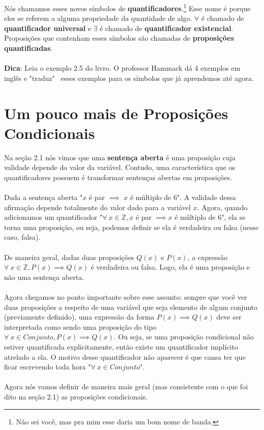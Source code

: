 \documentclass[a4paper,11pt]{book}
\theoremstyle{definition}
\theoremstyle{break}
\begin{document}
Nós chamamos esses novos símbolos de \textbf{quantificadores}.\footnote{Não sei você, mas pra mim esse daria um bom nome de banda.} Esse nome é porque eles se referem a alguma propriedade da quantidade de algo. $\forall$ é chamado de \textbf{quantificador universal} e $\exists$ é chamado de \textbf{quantificador existencial}. Proposições que contenham esses símbolos são chamadas de \textbf{proposições quantificadas}.
\\
\\
\textbf{Dica}: Leia o exemplo 2.5 do livro. O professor Hammack dá 4 exemplos em inglês e "traduz" \ esses exemplos para os símbolos que já aprendemos até agora.

\section{Um pouco mais de Proposições Condicionais}

Na seção 2.1 nós vimos que uma \textbf{sentença aberta} é uma proposição cuja validade depende do valor da variável. Contudo, uma característica que os quantificadores possuem é transformar sentenças abertas em proposições.
\\
\\
Dada a sentença aberta "$x$ é par $\implies$ $x$ é múltiplo de 6". A validade dessa afirmação depende totalmente do valor dado para a variável $x$. Agora, quando adicionamos um quantificador "$\forall \ x \in \mathbb{Z}, x$ é par $\implies x$ é múltiplo de 6", ela se torna uma proposição, ou seja, podemos definir se ela é verdadeira ou falsa (nesse caso, falsa).
\\
\\
De maneira geral, dadas duas proposições $Q(x)$ e $P(x)$, a expressão $\forall \ x \in \mathbb{Z}, P(x) \implies Q(x)$ é verdadeira ou falsa. Logo, ela é uma proposição e não uma sentença aberta.
\\
\\
Agora chegamos no ponto importante sobre esse assunto: sempre que você ver duas proposições a respeito de uma variável que seja elemento de algum conjunto (previamente definido), uma expressão da forma $P(x) \implies Q(x)$ deve ser interpretada como sendo uma proposição do tipo $\forall \ x \in Conjunto, P(x) \implies Q(x)$. Ou seja, se uma proposição condicional não estiver quantificada explicitamente, então existe um quantificador implícito atrelado a ela. O motivo desse quantificador não aparecer é que cansa ter que ficar escrevendo toda hora "$\forall \ x \in Conjunto$".
\\
\\
Agora nós vamos definir de maneira mais geral (mas consistente com o que foi dito na seção 2.1) as proposições condicionais.
\end{document}
